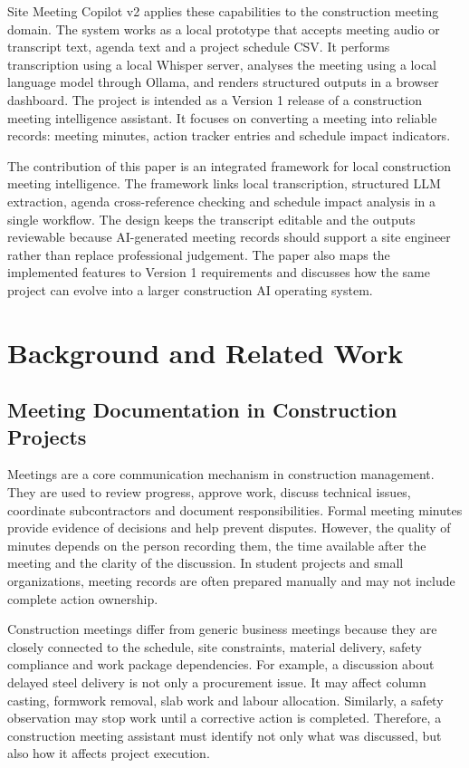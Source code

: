 \documentclass[11pt,a4paper]{article}
\begin{document}
Site Meeting Copilot v2 applies these capabilities to the construction meeting domain. The system works as a local prototype that accepts meeting audio or transcript text, agenda text and a project schedule CSV. It performs transcription using a local Whisper server, analyses the meeting using a local language model through Ollama, and renders structured outputs in a browser dashboard. The project is intended as a Version 1 release of a construction meeting intelligence assistant. It focuses on converting a meeting into reliable records: meeting minutes, action tracker entries and schedule impact indicators.

The contribution of this paper is an integrated framework for local construction meeting intelligence. The framework links local transcription, structured LLM extraction, agenda cross-reference checking and schedule impact analysis in a single workflow. The design keeps the transcript editable and the outputs reviewable because AI-generated meeting records should support a site engineer rather than replace professional judgement. The paper also maps the implemented features to Version 1 requirements and discusses how the same project can evolve into a larger construction AI operating system.

\section{Background and Related Work}

\subsection{Meeting Documentation in Construction Projects}

Meetings are a core communication mechanism in construction management. They are used to review progress, approve work, discuss technical issues, coordinate subcontractors and document responsibilities. Formal meeting minutes provide evidence of decisions and help prevent disputes. However, the quality of minutes depends on the person recording them, the time available after the meeting and the clarity of the discussion. In student projects and small organizations, meeting records are often prepared manually and may not include complete action ownership.

Construction meetings differ from generic business meetings because they are closely connected to the schedule, site constraints, material delivery, safety compliance and work package dependencies. For example, a discussion about delayed steel delivery is not only a procurement issue. It may affect column casting, formwork removal, slab work and labour allocation. Similarly, a safety observation may stop work until a corrective action is completed. Therefore, a construction meeting assistant must identify not only what was discussed, but also how it affects project execution.
\end{document}
